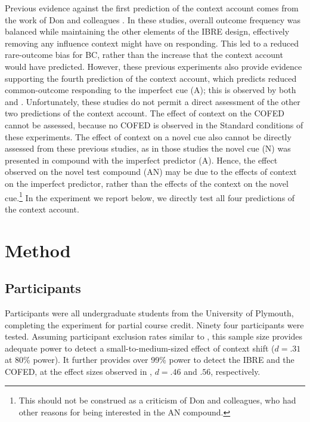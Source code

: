 \documentclass[twocolumn]{article}
\begin{document}
{Previous evidence against the first prediction of the context account comes from the work of Don and colleagues \citep{Don2017, Don2019}. In these studies, overall outcome frequency was balanced while maintaining the other elements of the IBRE design, effectively removing any influence context might have on responding. This led to a reduced rare-outcome bias for BC, rather than the increase that the context account would have predicted. However, these previous experiments also provide evidence supporting the fourth prediction of the context account, which predicts reduced common-outcome responding to the imperfect cue (A); this is observed by both \cite{Don2017} and \cite{Don2019}. Unfortunately, these studies do not permit a direct assessment of the other two predictions of the context account. The effect of context on the COFED cannot be assessed, because no COFED is observed in the Standard conditions of these experiments. The effect of context on a novel cue also cannot be directly assessed from these previous studies, as in those studies the novel cue (N) was presented in compound with the imperfect predictor (A). Hence, the effect observed on the novel test compound (AN) may be due to the effects of context on the imperfect predictor, rather than the effects of the context on the novel cue.\footnote{This should not be construed as a criticism of Don and colleagues, who had other reasons for being interested in the AN compound.} In the experiment we report below, we directly test all four predictions of the context account. 

\section{Method}

\subsection{Participants}

Participants were all undergraduate students from the University of Plymouth, completing the experiment for partial course credit. Ninety four participants were tested. Assuming participant exclusion rates similar to \cite{Inkster2019}, this sample size provides adequate power to detect a small-to-medium-sized effect of context shift ($d = .31$ at 80\% power). It further provides over 99\% power to detect the IBRE and the COFED, at the effect sizes observed in \cite{Inkster2019}, $d = .46$ and $.56$, respectively.

}
\end{document}
